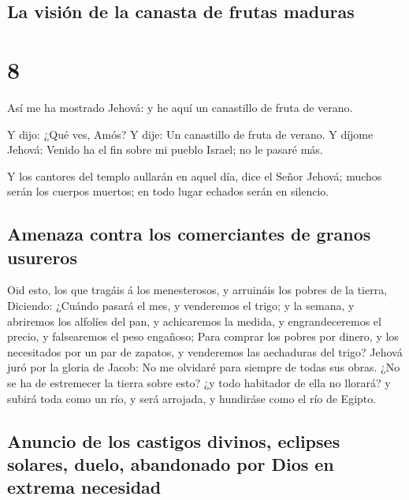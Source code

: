 \hypertarget{la-visiuxf3n-de-la-canasta-de-frutas-maduras}{%
\subsection{La visión de la canasta de frutas
maduras}\label{la-visiuxf3n-de-la-canasta-de-frutas-maduras}}

\hypertarget{section-7}{%
\section{8}\label{section-7}}

 Así me ha mostrado Jehová: y he aquí un canastillo de
fruta de verano.

 Y dijo: ¿Qué ves, Amós? Y dije: Un canastillo de fruta de
verano. Y díjome Jehová: Venido ha el fin sobre mi pueblo Israel; no le
pasaré más.

 Y los cantores del templo aullarán en aquel día, dice el
Señor Jehová; muchos serán los cuerpos muertos; en todo lugar echados
serán en silencio.

\hypertarget{amenaza-contra-los-comerciantes-de-granos-usureros}{%
\subsection{Amenaza contra los comerciantes de granos
usureros}\label{amenaza-contra-los-comerciantes-de-granos-usureros}}

 Oid esto, los que tragáis á los menesterosos, y arruináis
los pobres de la tierra,  Diciendo: ¿Cuándo pasará el mes,
y venderemos el trigo; y la semana, y abriremos los alfolíes del pan, y
achicaremos la medida, y engrandeceremos el precio, y falsearemos el
peso engañoso;  Para comprar los pobres por dinero, y los
necesitados por un par de zapatos, y venderemos las aechaduras del
trigo?  Jehová juró por la gloria de Jacob: No me olvidaré
para siempre de todas sus obras.  ¿No se ha de estremecer
la tierra sobre esto? ¿y todo habitador de ella no llorará? y subirá
toda como un río, y será arrojada, y hundiráse como el río de Egipto.

\hypertarget{anuncio-de-los-castigos-divinos-eclipses-solares-duelo-abandonado-por-dios-en-extrema-necesidad}{%
\subsection{Anuncio de los castigos divinos, eclipses solares, duelo,
abandonado por Dios en extrema
necesidad}\label{anuncio-de-los-castigos-divinos-eclipses-solares-duelo-abandonado-por-dios-en-extrema-necesidad}}

